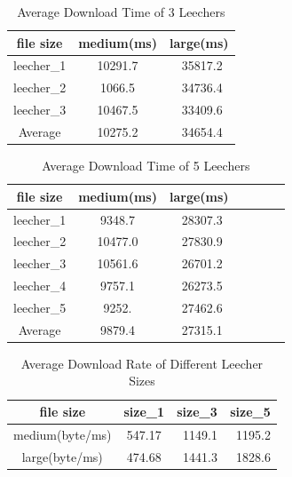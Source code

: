 \documentclass[conference]{IEEEtran}
\begin{document}
	\begin{table}
		\caption{Average Download Time of 3 Leechers}
		\begin{center}
			\begin{tabular}{ccc}
				\hline
				\rule{0pt}{12pt}file size  & \rule{0pt}{12pt}medium(ms) & \rule{0pt}{12pt}large(ms)\\
				\hline\rule{0pt}{12pt}
				leecher\_1   &    10291.7 & \   35817.2   \\
				leecher\_2   &    1066.5 & \   34736.4 \\
				leecher\_3   &    10467.5& \  33409.6  \\
				\hline\rule{0pt}{12pt}
				Average   &   10275.2 & \  34654.4   \\				
				\hline
			\end{tabular}
		\end{center}
	\end{table}
	
		\begin{table}
			\caption{Average Download Time of 5 Leechers}
			\begin{center}
				\begin{tabular}{cccccc|c}
					\hline
					\rule{0pt}{12pt}file size  & \rule{0pt}{12pt}medium(ms) & \rule{0pt}{12pt}large(ms)\\
					\hline\rule{0pt}{12pt}
					leecher\_1   &    9348.7 & \   28307.3    \\
					leecher\_2   &    10477.0 & \   27830.9 \\
					leecher\_3   &    10561.6& \  	26701.2  \\
					leecher\_4   &    9757.1 & \   26273.5  \\
					leecher\_5   &    9252.& \ 27462.6  \\
					\hline\rule{0pt}{12pt}
					Average   &    9879.4  & \  27315.1  \\	
					\hline
				\end{tabular}
			\end{center}
		\end{table}
	
		\begin{table}
			\caption{Average Download Rate of Different Leecher Sizes}
			\begin{center}
				\begin{tabular}{cccc}
					\hline
					\rule{0pt}{12pt}file size  & \rule{0pt}{12pt}size\_1   &\rule{0pt}{12pt} size\_3  &\rule{0pt}{12pt}size\_5\\
					\hline\rule{0pt}{12pt}
					medium(byte/ms)   &    547.17 & \ 	1149.1 & \ 	1195.2 \\
					large(byte/ms)    &   474.68 & \ 	1441.3 & \ 	1828.6  \\
					\hline
				\end{tabular}
			\end{center}
		\end{table}
	
\end{document}

